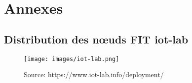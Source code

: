 \section*{Annexes} %
\appendix
\renewcommand\thefigure{\thesection.\arabic{figure}}
\setcounter{figure}{0}
\setcounter{section}{1}


\subsection{\label{iot-lab}Distribution des nœuds FIT iot-lab}


\begin{figure}[ht!]
\centering
\texttt{[image: images/iot-lab.png]}
\caption{Source: https://www.iot-lab.info/deployment/}
\end{figure}